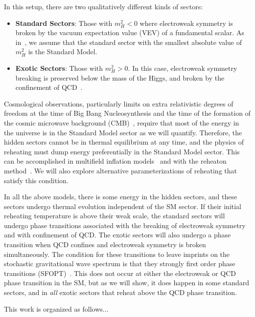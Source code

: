 \documentclass[nofootinbib,twocolumn,preprintnumbers]{revtex4-1}
\begin{document}
In this setup, there are two qualitatively different kinds of sectors:
\begin{itemize}
\item \textbf{Standard Sectors}: Those with $m_H^2 < 0$ where electroweak symmetry is broken by the vacuum expectation value (VEV) of a fundamental scalar. As in~\cite{Arkani-Hamed:2016rle}, we assume that the standard sector with the smallest absolute value of $m_H^2$ is the Standard Model.
\item \textbf{Exotic Sectors}: Those with  $m_H^2 > 0$. In this case, electroweak symmetry breaking is preserved below the mass of the Higgs, and broken by the confinement of QCD~\cite{Arkani-Hamed:2016rle,Pisarski:1983ms}.
\end{itemize}
Cosmological observations, particularly limits on extra relativistic degrees of freedom at the time of Big Bang Nucleosynthesis and the time of the formation of the cosmic microwave background (CMB)~\cite{Aghanim:2018eyx}, require that most of the energy in the universe is in the Standard Model sector as we will quantify. Therefore, the hidden sectors cannot be in thermal equilibrium at any time, and the physics of reheating must dump energy preferentially in the Standard Model sector. This can be accomplished in multifield inflation models~\cite{} and with the reheaton method~\cite{Arkani-Hamed:2016rle}. We will also explore alternative parameterizations of reheating that satisfy this condition.

In all the above models, there is some energy in the hidden sectors, and these sectors undergo thermal evolution independent of the SM sector. If their initial reheating temperature is above their weak scale, the standard sectors will undergo phase transitions associated with the breaking of electroweak symmetry and with confinement of QCD. The exotic sectors will also undergo a phase transition when QCD confines and electroweak symmetry is broken simultaneously. The condition for these transitions to leave imprints on the stochastic gravitational wave spectrum is that they strongly first order phase transitions (SFOPT)~\cite{Witten:1984rs,Hogan:1984hx,Hogan:1986qda,PhysRevLett.65.3080}. This does not occur at either the electroweak or QCD phase transition in the SM, but as we will show, it does happen in some standard sectors, and in \textit{all} exotic sectors that reheat above the QCD phase transition. 



This work is organized as follows...
\end{document}
